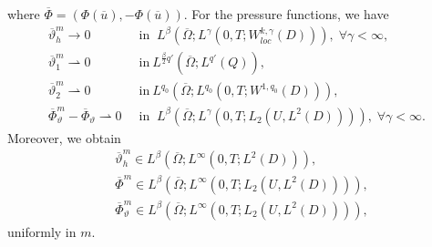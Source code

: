 \documentclass[reqno]{amsart}
\theoremstyle{definition}
\theoremstyle{remark}
\numberwithin{equation}{section} \allowdisplaybreaks
\begin{document}
where $\overline{\Phi}=(\Phi(\overline{u}),-\Phi(\overline{u})).$
For the pressure functions, we have
\begin{align}\label{5.44}
\overline{\vartheta}_h^m\rightarrow 0& ~\mbox{ in }~
L^{\beta}(\overline{\Omega};L^{\gamma}(0,T;W^{k,\gamma}_{loc}(D))),\;
\forall
\gamma<\infty,\\
\label{5.45} \overline{\vartheta}_1^m\rightharpoonup 0& ~\mbox{ in
}~
L^{\frac{\beta}{2}q'}(\overline{\Omega};L^{q'}(Q)),\\
\label{5.46} \overline{\vartheta}_2^m\rightharpoonup 0& ~\mbox{ in
}~ L^{q_0}
(\overline{\Omega};L^{q_0}(0,T;W^{1,q_0}(D))),\\
\label{5.47}
\overline{\Phi}_{\vartheta}^m-\overline{\Phi}_\vartheta\rightharpoonup
0 &~\mbox{ in }~
L^{\beta}(\overline{\Omega};L^{\gamma}(0,T;L_2({U},L^2(D)))),\;
\forall \gamma<\infty.
\end{align}
Moreover, we obtain
\begin{align}\label{5.48}
&\overline{\vartheta}_h^m \in L^{\beta}(\overline{\Omega};L^{\infty}(0,T;L^2(D))),\\
\label{5.49}
&\overline{\Phi}^m\in L^{\beta}(\overline{\Omega};L^{\infty}(0,T;L_2({U},L^2(D)))),\\
\label{5.50} &\overline{\Phi}_{\vartheta}^m\in
L^{\beta}(\overline{\Omega};L^{\infty}(0,T;L_2({U},L^2(D)))),
\end{align}
uniformly in $m$.
\end{document}
